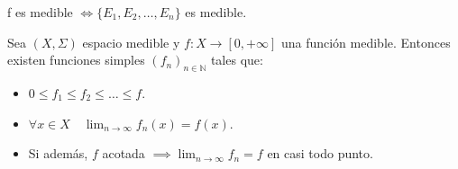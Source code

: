 \begin{observación}
f es medible $\iff \{E_1, E_2, \dots, E_n\}$ es medible.
\end{observación}
\begin{teorema}
    Sea $(X, \Sigma)$ espacio medible y $f: X \to [0, +\infty]$ una función medible. Entonces existen funciones simples $(f_n)_{n \in \mathbb{N}}$ tales que:
    \vspace{-0.5em}
    \begin{itemize}
        \item $0 \leq f_1 \leq f_2 \leq \dots \leq f$.
        \item $\forall x \in X \quad \lim_{n \to \infty}f_n(x) = f(x)$.
        \item Si además, $f$ acotada $\implies \lim_{n \to \infty}f_n = f$ en casi todo
              punto.
    \end{itemize}
\end{teorema}
